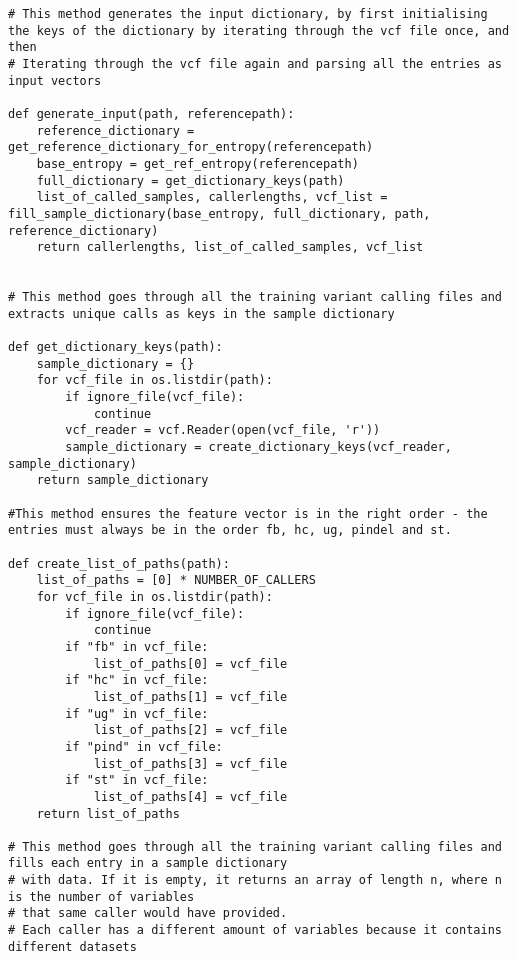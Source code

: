 \documentclass{article}
\begin{document}
\begin{verbatim}
# This method generates the input dictionary, by first initialising the keys of the dictionary by iterating through the vcf file once, and then
# Iterating through the vcf file again and parsing all the entries as input vectors

def generate_input(path, referencepath):
    reference_dictionary = get_reference_dictionary_for_entropy(referencepath)
    base_entropy = get_ref_entropy(referencepath)
    full_dictionary = get_dictionary_keys(path)
    list_of_called_samples, callerlengths, vcf_list = fill_sample_dictionary(base_entropy, full_dictionary, path, reference_dictionary)
    return callerlengths, list_of_called_samples, vcf_list


# This method goes through all the training variant calling files and extracts unique calls as keys in the sample dictionary

def get_dictionary_keys(path):
    sample_dictionary = {}
    for vcf_file in os.listdir(path):
        if ignore_file(vcf_file):
            continue
        vcf_reader = vcf.Reader(open(vcf_file, 'r'))
        sample_dictionary = create_dictionary_keys(vcf_reader, sample_dictionary)
    return sample_dictionary

#This method ensures the feature vector is in the right order - the entries must always be in the order fb, hc, ug, pindel and st.

def create_list_of_paths(path):
    list_of_paths = [0] * NUMBER_OF_CALLERS
    for vcf_file in os.listdir(path):
        if ignore_file(vcf_file):
            continue
        if "fb" in vcf_file:
            list_of_paths[0] = vcf_file
        if "hc" in vcf_file:
            list_of_paths[1] = vcf_file
        if "ug" in vcf_file:
            list_of_paths[2] = vcf_file
        if "pind" in vcf_file:
            list_of_paths[3] = vcf_file
        if "st" in vcf_file:
            list_of_paths[4] = vcf_file
    return list_of_paths

# This method goes through all the training variant calling files and fills each entry in a sample dictionary
# with data. If it is empty, it returns an array of length n, where n is the number of variables
# that same caller would have provided.
# Each caller has a different amount of variables because it contains different datasets


\end{verbatim}
\end{document}
